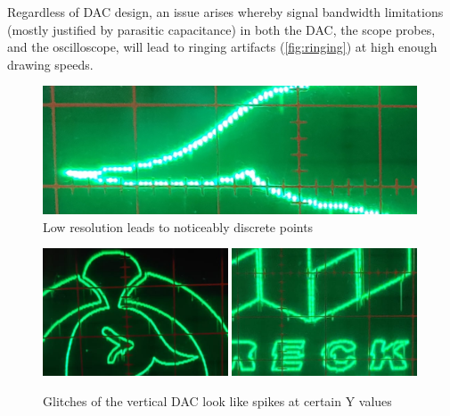 \documentclass[12pt]{article}
\begin{document}
Regardless of DAC design, an issue arises whereby signal bandwidth limitations (mostly justified by parasitic capacitance) in both the DAC, the scope probes, and the oscilloscope, will lead to ringing artifacts (\autoref{fig:ringing}) at high enough drawing speeds.

\begin{figure}[p]
\centering
\includegraphics[width=0.99\textwidth]{images/low-resolution.png}
\caption{Low resolution leads to noticeably discrete points}
\label{fig:low-resolution}
\end{figure}

\begin{figure}[p]
\centering
\includegraphics[width=0.49\textwidth]{images/vertical-dac-glitches1.png}\hspace{0.01\textwidth}
\includegraphics[width=0.49\textwidth]{images/vertical-dac-glitches2.png}
\caption{Glitches of the vertical DAC look like spikes at certain Y values}
\label{fig:vertical-dac-glitches}
\end{figure}
\end{document}
